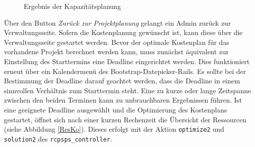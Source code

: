 \documentclass[a4paper,12pt,parskip,bibtotoc,liststotoc]{article}
\begin{document}
\begin{figure}[h!]
  \begin{center}
    \caption{Ergebnis der Kapazitätsplanung}  \label{Kap}
  \end{center}
\end{figure}



Über den Button \textit{Zurück zur Projektplanung} gelangt ein Admin zurück zur Verwaltungsseite. Sofern die Kostenplanung gewünscht ist, kann diese über die Verwaltungsseite gestartet werden. Bevor der optimale Kostenplan für das vorhandene Projekt berechnet werden kann, muss zunächst äquivalent zur Einstellung des Starttermins eine Deadline eingerichtet werden. Dies funktioniert erneut über ein Kalendermenü des \glqq Bootstrap-Datepicker-Rails\grqq. Es sollte bei der Bestimmung der Deadline darauf geachtet werden, dass die Deadline in einem sinnvollen Verhältnis zum Starttermin steht. Eine zu kurze oder lange Zeitspanne zwischen den beiden Terminen kann zu unbrauchbaren Ergebnissen führen. Ist eine geeignete Deadline ausgewählt und die Optimierung des Kostenplans gestartet, öffnet sich nach einer kurzen Rechenzeit die Übersicht der Ressourcen (siehe Abbildung \ref{ResKo}). Dieses erfolgt mit der Aktion \texttt{optimize2} und \texttt{solution2} des \texttt{rcpsps\_controller}.\\
\end{document}
